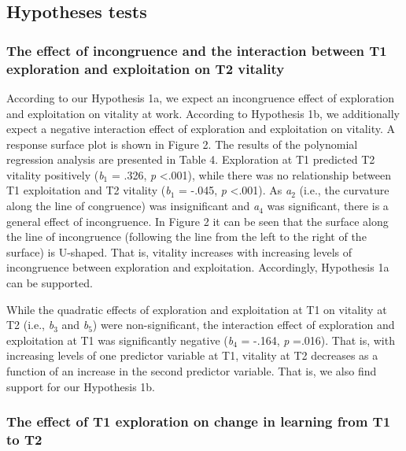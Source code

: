 \documentclass[man]{apa7}
\begin{document}
\subsection{Hypotheses tests}
\subsubsection{The effect of incongruence and the interaction between T1 exploration and exploitation on T2 vitality}
According to our Hypothesis 1a, we expect an incongruence effect of exploration and exploitation on vitality at work.
According to Hypothesis 1b, we additionally expect a negative interaction effect of exploration and exploitation on vitality.
A response surface plot is shown in Figure 2. 
The results of the polynomial regression analysis are presented in Table 4. 
Exploration at T1 predicted T2 vitality positively (\textit{b}$_1$ = .326, \textit{p} <.001), while there was no relationship between T1 exploitation and T2 vitality (\textit{b}$_1$ = -.045, \textit{p} <.001). 
As \textit{a}$_2$ (i.e., the curvature along the line of congruence) was insignificant and \textit{a}$_4$ was significant, there is a general effect of incongruence. 
In Figure 2 it can be seen that the surface along the line of incongruence (following the line from the left to the right of the surface) is U-shaped.
That is, vitality increases with increasing levels of incongruence between exploration and exploitation. 
Accordingly, Hypothesis 1a can be supported. \par 

While the quadratic effects of exploration and exploitation at T1 on vitality at T2 (i.e., \textit{b}$_3$ and \textit{b}$_5$) were non-significant, the interaction effect of exploration and exploitation at T1 was significantly negative (\textit{b}$_4$ = -.164, \textit{p} =.016).
That is, with increasing levels of one predictor variable at T1, vitality at T2 decreases as a function of an increase in the second predictor variable. 
That is, we also find support for our Hypothesis 1b. 

\subsubsection{The effect of T1 exploration on change in learning from T1 to T2}
\end{document}
